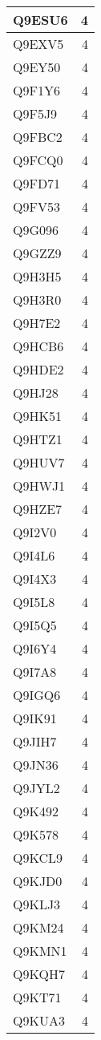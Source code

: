 \documentclass[
]{book}
\theoremstyle{definition}
\theoremstyle{definition}
\theoremstyle{definition}
\theoremstyle{definition}
\theoremstyle{remark}
\begin{document}
\begin{table}
\begin{tabular}{l|r}
\hline
Q9ESU6 & 4\\
\hline
Q9EXV5 & 4\\
\hline
Q9EY50 & 4\\
\hline
Q9F1Y6 & 4\\
\hline
Q9F5J9 & 4\\
\hline
Q9FBC2 & 4\\
\hline
Q9FCQ0 & 4\\
\hline
Q9FD71 & 4\\
\hline
Q9FV53 & 4\\
\hline
Q9G096 & 4\\
\hline
Q9GZZ9 & 4\\
\hline
Q9H3H5 & 4\\
\hline
Q9H3R0 & 4\\
\hline
Q9H7E2 & 4\\
\hline
Q9HCB6 & 4\\
\hline
Q9HDE2 & 4\\
\hline
Q9HJ28 & 4\\
\hline
Q9HK51 & 4\\
\hline
Q9HTZ1 & 4\\
\hline
Q9HUV7 & 4\\
\hline
Q9HWJ1 & 4\\
\hline
Q9HZE7 & 4\\
\hline
Q9I2V0 & 4\\
\hline
Q9I4L6 & 4\\
\hline
Q9I4X3 & 4\\
\hline
Q9I5L8 & 4\\
\hline
Q9I5Q5 & 4\\
\hline
Q9I6Y4 & 4\\
\hline
Q9I7A8 & 4\\
\hline
Q9IGQ6 & 4\\
\hline
Q9IK91 & 4\\
\hline
Q9JIH7 & 4\\
\hline
Q9JN36 & 4\\
\hline
Q9JYL2 & 4\\
\hline
Q9K492 & 4\\
\hline
Q9K578 & 4\\
\hline
Q9KCL9 & 4\\
\hline
Q9KJD0 & 4\\
\hline
Q9KLJ3 & 4\\
\hline
Q9KM24 & 4\\
\hline
Q9KMN1 & 4\\
\hline
Q9KQH7 & 4\\
\hline
Q9KT71 & 4\\
\hline
Q9KUA3 & 4\\

\end{tabular}
\end{table}
\end{document}
